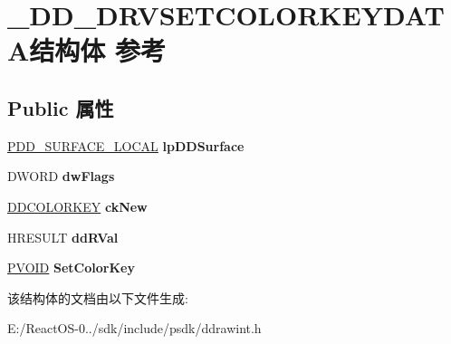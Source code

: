 \hypertarget{struct___d_d___d_r_v_s_e_t_c_o_l_o_r_k_e_y_d_a_t_a}{}\section{\+\_\+\+D\+D\+\_\+\+D\+R\+V\+S\+E\+T\+C\+O\+L\+O\+R\+K\+E\+Y\+D\+A\+T\+A结构体 参考}
\label{struct___d_d___d_r_v_s_e_t_c_o_l_o_r_k_e_y_d_a_t_a}
\subsection*{Public 属性}
\begin{DoxyCompactItemize}
\item 
\mbox{\label{struct___d_d___d_r_v_s_e_t_c_o_l_o_r_k_e_y_d_a_t_a_aeeacd12522f9150fc53db6dfd5f071da}} 
\hyperlink{struct___d_d___s_u_r_f_a_c_e___l_o_c_a_l}{P\+D\+D\+\_\+\+S\+U\+R\+F\+A\+C\+E\+\_\+\+L\+O\+C\+AL} {\bfseries lp\+D\+D\+Surface}
\item 
\mbox{\label{struct___d_d___d_r_v_s_e_t_c_o_l_o_r_k_e_y_d_a_t_a_a170ec6c2419b9480826eeca501c7a68e}} 
D\+W\+O\+RD {\bfseries dw\+Flags}
\item 
\mbox{\label{struct___d_d___d_r_v_s_e_t_c_o_l_o_r_k_e_y_d_a_t_a_a817f85d280b05444a8d8e48d8e2435ae}} 
\hyperlink{struct_d_d_c_o_l_o_r_k_e_y}{D\+D\+C\+O\+L\+O\+R\+K\+EY} {\bfseries ck\+New}
\item 
\mbox{\label{struct___d_d___d_r_v_s_e_t_c_o_l_o_r_k_e_y_d_a_t_a_a80db0fcd6f1097f69bac3bb17cd7dda5}} 
H\+R\+E\+S\+U\+LT {\bfseries dd\+R\+Val}
\item 
\mbox{\label{struct___d_d___d_r_v_s_e_t_c_o_l_o_r_k_e_y_d_a_t_a_a06af244bc98934caa7deb7743d34e85e}} 
\hyperlink{interfacevoid}{P\+V\+O\+ID} {\bfseries Set\+Color\+Key}
\end{DoxyCompactItemize}


该结构体的文档由以下文件生成\+:\begin{DoxyCompactItemize}
\item 
E\+:/\+React\+O\+S-\/0../sdk/include/psdk/ddrawint.\+h\end{DoxyCompactItemize}
